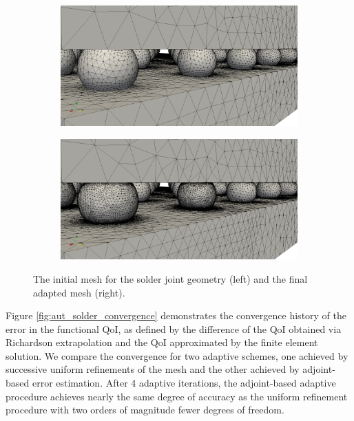 \begin{figure}[ht!]
\centering
\begin{subfigure}{.5\textwidth}
\centering
\includegraphics[width=.99\linewidth]{img/aut_solder_mesh_initial2.png}
\end{subfigure}%
\begin{subfigure}{0.5\textwidth}
\centering
\includegraphics[width=.99\linewidth]{img/aut_solder_mesh_final2.png}
\end{subfigure}%
\caption{The initial mesh for the solder joint geometry (left) and the
final adapted mesh (right).}
\label{fig:aut_solder_mesh2}
\end{figure}

Figure \ref{fig:aut_solder_convergence} demonstrates the
convergence history of the error in the functional QoI,
as defined by the difference of the QoI obtained via
Richardson extrapolation and the QoI approximated by the
finite element solution. We compare the convergence for
two adaptive schemes, one achieved by successive uniform
refinements of the mesh and the other achieved by adjoint-based
error estimation. After 4 adaptive iterations, the adjoint-based
adaptive procedure achieves nearly the same degree of accuracy
as the uniform refinement procedure with two orders of
magnitude fewer degrees of freedom.

